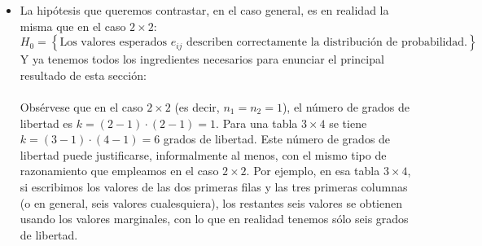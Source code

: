 \begin{itemize}
    \item La hipótesis que queremos contrastar, en el caso general, es en realidad la misma que en el caso $2\times 2$:
        \[H_0=\left\{\mbox{Los valores esperados $e_{ij}$ describen correctamente la distribución de probabilidad.}\right\}\]
        Y ya tenemos todos los ingredientes necesarios para enunciar el principal resultado de esta sección:\\[3mm]
        \\[3mm]
        Obsérvese que en el caso $2\times 2$ (es decir, $n_1=n_2=1$), el número de grados de libertad es $k=(2-1)\cdot(2-1)=1$. Para una tabla $3\times 4$ se tiene $k=(3-1)\cdot(4-1)=6$ grados de libertad. Este número de grados de libertad puede justificarse, informalmente al menos, con el mismo tipo de razonamiento que empleamos en el caso $2\times 2$. Por ejemplo, en esa tabla $3\times 4$, si escribimos los valores de las dos primeras filas y las tres primeras columnas (o en general, seis valores cualesquiera), los restantes seis valores se obtienen usando los valores marginales, con lo que en realidad tenemos sólo seis grados de libertad.











\end{itemize}
